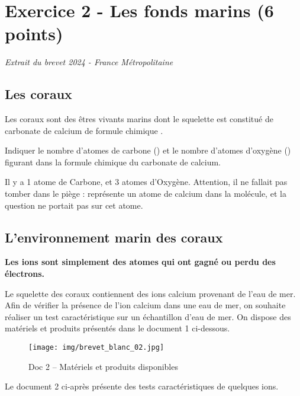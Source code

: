 \documentclass[answers]{exam}
\begin{document}
\section*{Exercice 2 - Les fonds marins (6 points)}

\textit{Extrait du brevet 2024 - France Métropolitaine} \par

\subsection*{Les coraux}

Les coraux sont des êtres vivants marins dont le squelette est constitué de carbonate de calcium de formule chimique .

\begin{questions}
    \question[1] Indiquer le nombre d'atomes de carbone () et le nombre d'atomes d'oxygène () figurant dans la formule chimique du carbonate de calcium.
    \begin{solution}
      Il y a 1 atome de Carbone, et 3 atomes d'Oxygène. Attention, il ne fallait pas tomber dans le piège :  représente un atome de calcium dans la molécule, et la question ne portait pas sur cet atome.
    \end{solution}
\end{questions}

\subsection*{L'environnement marin des coraux}

\textbf{Les ions sont simplement des atomes qui ont gagné ou perdu des électrons.} \par
\vspace{1em}
Le squelette des coraux contiennent des ions calcium  provenant de l'eau de mer.  
Afin de vérifier la présence de l'ion calcium  dans une eau de mer, on souhaite réaliser un test caractéristique sur un échantillon d'eau de mer.
On dispose des matériels et produits présentés dans le document 1 ci-dessous.

\begin{figure}[H]
  \centering
  \texttt{[image: img/brevet\_blanc\_02.jpg]}
  \captionsetup{labelformat=empty}
  \caption{\label{} Doc 2 – Matériels et produits disponibles}
\end{figure} 

Le document 2 ci-après présente des tests caractéristiques de quelques ions.
\end{document}
